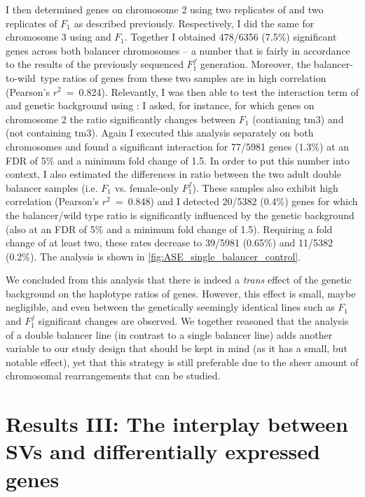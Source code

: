 I then determined \ase genes on chromosome 2 using two replicates of \Fcyo
and two replicates of $F_1$ as described previously. Respectively, I did
the same for chromosome 3 using \Ftm and $F_1$.
Together I obtained 478/6356 (7.5\%) significant \ase genes across both balancer
chromosomes – a number that is fairly in accordance to the results of the
previously sequenced $F_1^f$ generation. Moreover, the balancer-to-wild\ type
ratios of genes from these two samples are in high correlation (Pearson’s
$r^2$~=~0.824). Relevantly, I was then able to test the interaction term of \ase
and genetic background using \deseq: I asked, for instance, for which genes on
chromosome 2 the \ase ratio significantly changes between $F_1$ (contianing
\ac{tm3}) and \Fcyo (not containing \ac{tm3}).
Again I executed this analysis separately on both chromosomes and found a
significant interaction for 77/5981 genes (1.3\%) at an FDR of 5\% and a
minimum fold change of 1.5. In order to put this number into context, I also
estimated the differences in \ase ratio between the two adult double balancer
samples (i.e. $F_1$ vs. female-only $F_1^f$). These samples also exhibit high
correlation (Pearson’s $r^2$~=~0.848) and I detected 20/5382 (0.4\%) genes
for which the balancer/wild type ratio is significantly influenced by the
genetic background (also at an FDR of 5\% and a minimum fold change of 1.5).
Requiring a fold change of at least two, these rates decrease to 39/5981
(0.65\%) and 11/5382 (0.2\%).
The analysis is shown in \cref{fig:ASE_single_balancer_control}.

We concluded from this analysis that there is indeed a \textit{trans} effect of
the genetic background on the haplotype ratios of genes. However, this effect is
small, maybe negligible, and even between the genetically seemingly identical
lines such as $F_1$ and $F_1^f$ significant changes are observed.
We together reasoned that the analysis of a double balancer line (in contrast
to a single balancer line) adds another variable to our study design that should
be kept in mind (as it has a small, but notable effect), yet that this strategy
is still preferable due to the sheer amount of chromosomal rearrangements that
can be studied.







\section{Results III: The interplay between SVs and differentially expressed genes}
\label{sec:balancer_sv_interplay}

